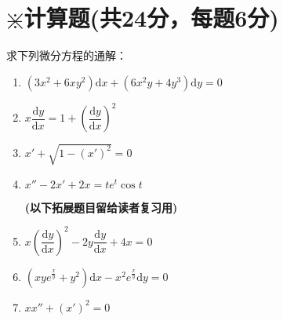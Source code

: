 \documentclass{ctexart}
\begin{document}
	\section{$\divideontimes$计算题(共24分，每题6分)}
	求下列微分方程的通解：
	\begin{enumerate}
		\item $(3x^2+6xy^2)\mathrm{d}x+(6x^2y+4y^3)\mathrm{d}y=0$
		\vspace{3cm}
		\item $x\dfrac{\mathrm{d}y}{\mathrm{d}x}=1+(\dfrac{\mathrm{d}y}{\mathrm{d}x})^2$
		\vspace{3cm}
		\item $x'+\sqrt{1-(x')^2}=0$
		\vspace{3cm}
		\item $x''-2x'+2x=te^t\cos t$
		\vspace{3cm}
		
		\textbf{(以下拓展题目留给读者复习用)}
		\item $x(\dfrac{\mathrm{d}y}{\mathrm{d}x})^2-2y\dfrac{\mathrm{d}y}{\mathrm{d}x}+4x=0$
		\vspace{3cm}
		\item $(xye^{\frac{x}{y}}+y^2)\mathrm{d}x-x^2e^{\frac{x}{y}}\mathrm{d}y=0$
		\vspace{3cm}
		\item $xx''+(x')^2=0$
		\vspace{3cm}
	\end{enumerate}
\end{document}
